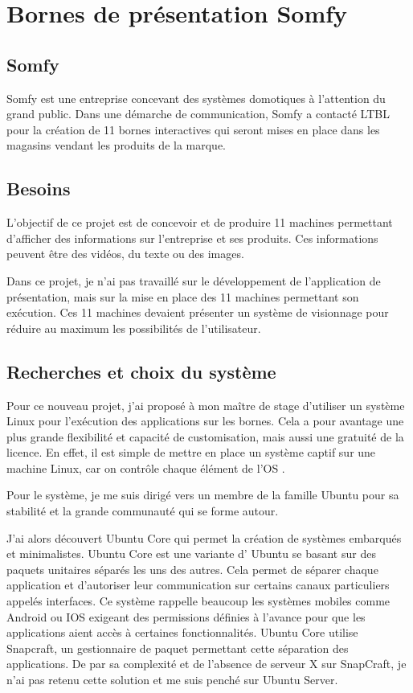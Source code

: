 \section{Bornes de présentation Somfy}

\subsection{Somfy}

Somfy est une entreprise concevant des systèmes domotiques à l'attention du grand public.
Dans une démarche de communication, Somfy a contacté LTBL pour la création de 11 bornes interactives qui seront mises en place dans les magasins vendant les produits de la marque.

\subsection{Besoins}

L'objectif de ce projet est de concevoir et de produire 11 machines permettant d'afficher des informations sur l'entreprise et ses produits.
Ces informations peuvent être des vidéos, du texte ou des images.

Dans ce projet, je n'ai pas travaillé sur le développement de l'application de présentation, mais sur la mise en place des 11 machines permettant son exécution.
Ces 11 machines devaient présenter un système de visionnage pour réduire au maximum les possibilités de l'utilisateur.

\subsection{Recherches et choix du système}

Pour ce nouveau projet, j'ai proposé à mon maître de stage d'utiliser un système Linux pour l'exécution des applications sur les bornes.
Cela a pour avantage une plus grande flexibilité et capacité de customisation, mais aussi une gratuité de la licence.
En effet, il est simple de mettre en place un système captif sur une machine Linux, car on contrôle chaque élément de l'OS .

Pour le système, je me suis dirigé vers un membre de la famille Ubuntu pour sa stabilité et la grande communauté qui se forme autour.

J'ai alors découvert Ubuntu Core qui permet la création de systèmes embarqués et minimalistes.
Ubuntu Core est une variante d’ Ubuntu se basant sur des paquets unitaires séparés les uns des autres.
Cela permet de séparer chaque application et d'autoriser leur communication sur certains canaux particuliers appelés interfaces.
Ce système rappelle beaucoup les systèmes mobiles comme Android ou IOS exigeant des permissions définies à l'avance pour que les applications aient accès à certaines fonctionnalités.
Ubuntu Core utilise Snapcraft, un gestionnaire de paquet permettant cette séparation des applications.
De par sa complexité et de l'absence de serveur X sur SnapCraft, je n'ai pas retenu cette solution et me suis penché sur Ubuntu Server.

